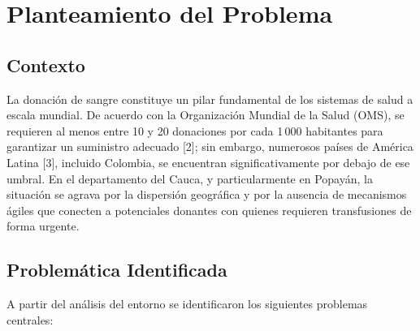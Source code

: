 \section{Planteamiento del Problema}

\subsection{Contexto}

La donación de sangre constituye un pilar fundamental de los sistemas de salud a escala mundial. De acuerdo con la Organización Mundial de la Salud (OMS), se requieren al menos entre 10 y 20 donaciones por cada 1\,000 habitantes para garantizar un suministro adecuado [2]; sin embargo, numerosos países de América Latina [3], incluido Colombia, se encuentran significativamente por debajo de ese umbral. En el departamento del Cauca, y particularmente en Popayán, la situación se agrava por la dispersión geográfica y por la ausencia de mecanismos ágiles que conecten a potenciales donantes con quienes requieren transfusiones de forma urgente.

\subsection{Problemática Identificada}

A partir del análisis del entorno se identificaron los siguientes problemas centrales:

